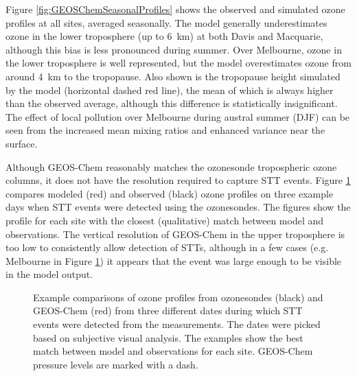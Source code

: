   \begin{figure*}[t]
    \caption{Observed and simulated tropospheric ozone profiles over Davis, Macquarie, and Melbourne, averaged seasonally.
    Model means (2005-2013 average) are shown as red solid lines, with red dashed lines showing the 10th and 90th percentiles.
    Ozonesonde means (over each season, for all years) are shown as black solid lines, with coloured shaded areas showing the 10th and 90th percentiles.
    The horizontal dashed lines show the mean tropopause heights from the model (red) and the observations (black).}
    \label{fig:GEOSChemSeasonalProfiles}
  \end{figure*}
  
  Figure \ref{fig:GEOSChemSeasonalProfiles} shows the observed and simulated ozone profiles at all sites, averaged seasonally.
  The model generally underestimates ozone in the lower troposphere (up to 6~km) at both Davis and Macquarie, although this bias is less pronounced during summer.
  Over Melbourne, ozone in the lower troposphere is well represented, but the model overestimates ozone from around 4~km to the tropopause.
  Also shown is the tropopause height simulated by the model (horizontal dashed red line), the mean of which is always higher than the observed average, although this difference is statistically insignificant.
  The effect of local pollution over Melbourne during austral summer (DJF) can be seen from the increased mean mixing ratios and enhanced variance near the surface.
  
  Although GEOS-Chem reasonably matches the ozonesonde tropospheric ozone columns, it does not have the resolution required to capture STT events.
  Figure \ref{fig:event_profile_comparison} compares modeled (red) and observed (black) ozone profiles on three example days when STT events were detected using the ozonesondes. 
  The figures show the profile for each site with the closest (qualitative) match between model and observations.
  The vertical resolution of GEOS-Chem in the upper troposphere is too low to consistently allow detection of STTs, although in a few cases (e.g. Melbourne in Figure \ref{fig:event_profile_comparison}) it appears that the event was large enough to be visible in the model output.
  
  \begin{figure}[t]
    \caption{%
      Example comparisons of ozone profiles from ozonesondes (black) and GEOS-Chem (red) from three different dates during which STT events were detected from the measurements.
      The dates were picked based on subjective visual analysis. 
      The examples show the best match between model and observations for each site.
      GEOS-Chem pressure levels are marked with a dash.}
    \label{fig:event_profile_comparison}
  \end{figure}
  
